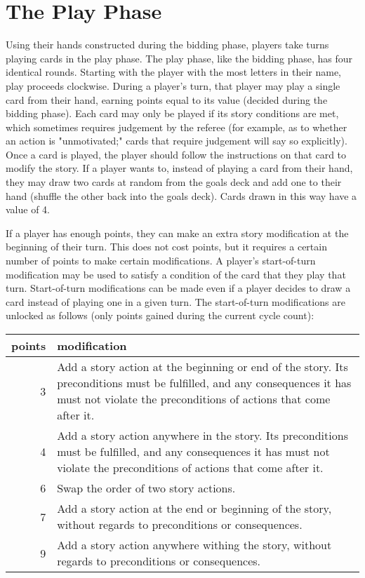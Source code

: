 \documentclass[12pt]{article}
\begin{document}
\section{The Play Phase}

Using their hands constructed during the bidding phase, players take turns playing cards in the play phase.
%
The play phase, like the bidding phase, has four identical rounds.
%
Starting with the player with the most letters in their name, play proceeds clockwise. 
%
During a player's turn, that player may play a single card from their hand, earning points equal to its value (decided during the bidding phase).
%
Each card may only be played if its story conditions are met, which sometimes requires judgement by the referee (for example, as to whether an action is "unmotivated;" cards that require judgement will say so explicitly).
%
Once a card is played, the player should follow the instructions on that card to modify the story.
%
If a player wants to, instead of playing a card from their hand, they may draw two cards at random from the goals deck and add one to their hand (shuffle the other back into the goals deck).
%
Cards drawn in this way have a value of 4.


If a player has enough points, they can make an extra story modification at the beginning of their turn.
%
This does not cost points, but it requires a certain number of points to make certain modifications.
%
A player's start-of-turn modification may be used to satisfy a condition of the card that they play that turn.
%
Start-of-turn modifications can be made even if a player decides to draw a card instead of playing one in a given turn.
%
The start-of-turn modifications are unlocked as follows (only points gained during the current cycle count):

\vspace{1em}
\begin{tabular}{r|p{5in}}
points & modification \\
\midrule
3 & Add a story action at the beginning or end of the story. Its preconditions must be fulfilled, and any consequences it has must not violate the preconditions of actions that come after it. \\
4 & Add a story action anywhere in the story. Its preconditions must be fulfilled, and any consequences it has must not violate the preconditions of actions that come after it. \\
6 & Swap the order of two story actions. \\
7 & Add a story action at the end or beginning of the story, without regards to preconditions or consequences. \\
9 & Add a story action anywhere withing the story, without regards to preconditions or consequences. \\
\end{tabular}
\vspace{0.3em}
\end{document}
